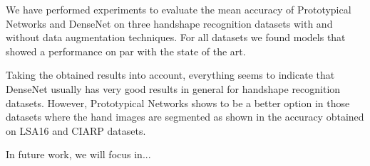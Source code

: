 We have performed experiments to evaluate the mean accuracy of Prototypical Networks and DenseNet on three handshape recognition datasets with and without data augmentation techniques.
For all datasets we found models that showed a performance on par with the state of the art.

Taking the obtained results into account, everything seems to indicate that DenseNet usually has very good results in general for handshape recognition datasets. However, Prototypical Networks shows to be a better option in those datasets where the hand images are segmented as shown in the accuracy obtained on LSA16 and CIARP datasets.

In future work, we will focus in...